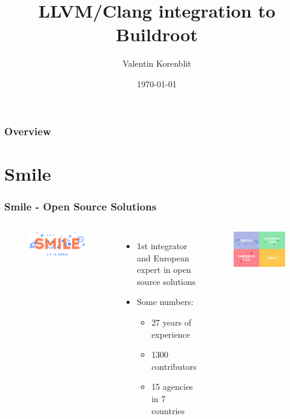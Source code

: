 \documentclass{smilebeamer}
\title[]{LLVM/Clang integration to Buildroot}
\author{Valentin Korenblit}
\institute[Smile]
{
Smile \\~\\
\medskip
\textit{valentin.korenblit@smile.fr}
}
\date{\today}
\begin{document}
\begin{frame}
\titlepage
\end{frame}

\begin{frame}
\frametitle{Overview}
\tableofcontents
\end{frame}

\section{Smile}

\begin{frame}
\frametitle{Smile - Open Source Solutions}
\begin{columns}[c]
\begin{figure}
\includegraphics[width=0.6\linewidth]{img/smile.png}
\end{figure}
\begin{itemize}
  \item 1st integrator and European expert in open source solutions
  \item Some numbers:
  \begin{itemize}
    \item 27 years of experience
    \item 1300 contributors
    \item 15 agencies in 7 countries
  \end{itemize}
\end{itemize}
\begin{figure}[H]
\centering
  \includegraphics[scale=0.25]{img/smile_offers.png}
\end{figure}
\end{columns}
\end{frame}
\end{document}
